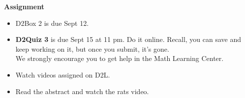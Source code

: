 \noindent
{\bf Assignment}\vspace{-.5cm}
\begin{itemize}
\item  D2Box 2 is due Sept 12.
\item 
{\bf D2Quiz 3} is due Sept 15 at 11 pm. Do it online. Recall, you can
  save and keep working on it, but once you submit, it's gone.\\
  We strongly encourage you to get help in the Math Learning Center.
\item Watch videos assigned on D2L.   
\item Read the abstract and watch the rats video.
\end{itemize}





